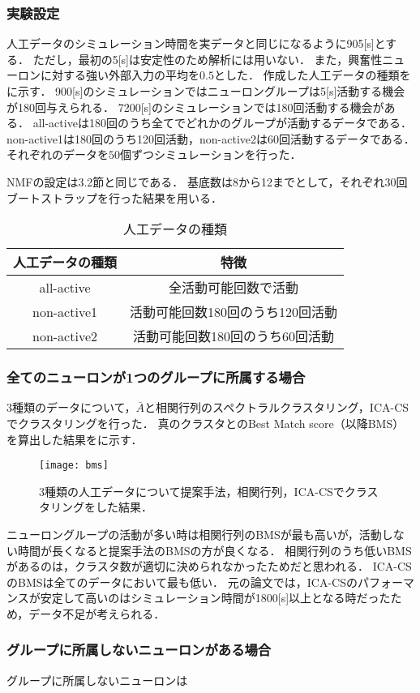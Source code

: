 \subsubsection{実験設定}
人工データのシミュレーション時間を実データと同じになるように905[s]とする．
ただし，最初の5[s]は安定性のため解析には用いない．
また，興奮性ニューロンに対する強い外部入力の平均を$0.5$とした．
作成した人工データの種類をに示す．
900[s]のシミュレーションではニューロングループは5[s]活動する機会が180回与えられる．
7200[s]のシミュレーションでは180回活動する機会がある．
all-activeは180回のうち全てでどれかのグループが活動するデータである．
non-active1は180回のうち120回活動，non-active2は60回活動するデータである．
それぞれのデータを$50$個ずつシミュレーションを行った．

NMFの設定は3.2節と同じである．
基底数は8から12までとして，それぞれ30回ブートストラップを行った結果を用いる．

\begin{table}[htb]
  \center
  \begin{tabular}{|c|c|} \hline
    人工データの種類 & 特徴 \\ \hline
		all-active & 全活動可能回数で活動 \\
		non-active1 & 活動可能回数180回のうち120回活動 \\
		non-active2 & 活動可能回数180回のうち60回活動 \\ \hline
  \end{tabular}
  \caption{人工データの種類}
  \label{tab:art_dat}
\end{table}

\subsubsection{全てのニューロンが1つのグループに所属する場合}
3種類のデータについて，$\bar{A}$と相関行列のスペクトラルクラスタリング，ICA-CSでクラスタリングを行った．
真のクラスタとのBest Match score（以降BMS）を算出した結果をに示す．
\begin{figure}[htbp]
    \begin{center}
        \texttt{[image: bms]}
        \caption{3種類の人工データについて提案手法，相関行列，ICA-CSでクラスタリングをした結果．}
        \label{fig:bms}
    \end{center}
\end{figure}
ニューロングループの活動が多い時は相関行列のBMSが最も高いが，活動しない時間が長くなると提案手法のBMSの方が良くなる．
相関行列のうち低いBMSがあるのは，クラスタ数が適切に決められなかったためだと思われる．
ICA-CSのBMSは全てのデータにおいて最も低い．
元の論文では，ICA-CSのパフォーマンスが安定して高いのはシミュレーション時間が1800[s]以上となる時だったため，データ不足が考えられる．

\subsubsection{グループに所属しないニューロンがある場合}
グループに所属しないニューロンは
